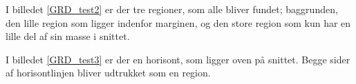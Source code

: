 I billedet \ref{GRD_test2} er der tre regioner, som
alle bliver fundet; baggrunden, den lille region som ligger indenfor
marginen, og den store region som kun har en lille del af sin masse
i snittet. 

\begin{figure}[!h]
    \centering
    	\hspace{1em}
		\hspace{1em}
        \caption[]{}
     \label{GRD_test2_sammen}
\end{figure}

I billedet \ref{GRD_test3} er der en horisont, som ligger oven på
snittet. Begge sider af horisontlinjen bliver udtrukket som en region.

